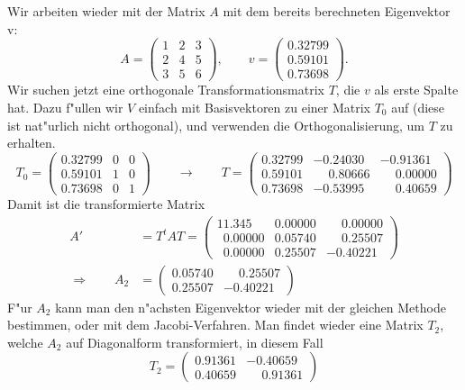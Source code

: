 \begin{beispiel}
Wir arbeiten wieder mit der Matrix $A$ mit dem bereits berechneten
Eigenvektor v:
\[
A=\begin{pmatrix}
1&2&3\\
2&4&5\\
3&5&6
\end{pmatrix}
,\qquad
v=\begin{pmatrix}
   0.32799\\
   0.59101\\
   0.73698
\end{pmatrix}.
\]
Wir suchen jetzt eine orthogonale Transformationsmatrix $T$, die $v$
als erste Spalte hat.
Dazu f"ullen wir $V$ einfach mit Basisvektoren
zu einer Matrix $T_0$ auf (diese ist nat"urlich nicht orthogonal),
und verwenden die Orthogonalisierung, um $T$ zu erhalten.
\[
T_0=\begin{pmatrix}
   0.32799&0&0\\
   0.59101&1&0\\
   0.73698&0&1
\end{pmatrix}
\qquad\rightarrow\qquad
T=
\begin{pmatrix}
   0.32799 &-0.24030& -0.91361\\
   0.59101 &\phantom{-} 0.80666&  \phantom{-}0.00000\\
   0.73698 &-0.53995&  \phantom{-}0.40659
\end{pmatrix}
\]
Damit ist die transformierte Matrix 
\begin{align*}
A'&=T^tAT=\begin{pmatrix}
   11.345              &0.00000 & \phantom{-}0.00000\\
   \phantom{0}0.00000  &0.05740 & \phantom{-}0.25507\\
   \phantom{0}0.00000  &0.25507 &-0.40221
\end{pmatrix}
\\
\Rightarrow\qquad
A_2&=
\begin{pmatrix}
   0.05740 & \phantom{-}0.25507\\
   0.25507 &-0.40221
\end{pmatrix}
\end{align*}
F"ur $A_2$ kann man den n"achsten Eigenvektor wieder mit der
gleichen Methode bestimmen, oder mit dem Jacobi-Verfahren.
Man findet wieder eine Matrix $T_2$, welche $A_2$ auf Diagonalform
transformiert, in diesem Fall
\[
T_2=\begin{pmatrix}
   0.91361&          -0.40659\\
   0.40659&\phantom{-}0.91361

\end{pmatrix}\]
\end{beispiel}
